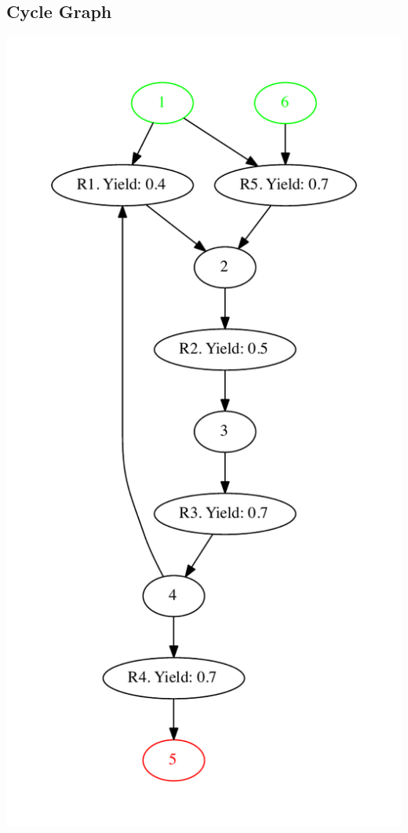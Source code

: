 \documentclass[a4paper,10pt,titlepage]{paper}
\begin{document}
\subsection{Cycle Graph}
\centering
\includegraphics[scale=0.4]{TestGrafer/CycleTest.pdf}
\label{Appendix::Cycle Graph}
\end{document}
